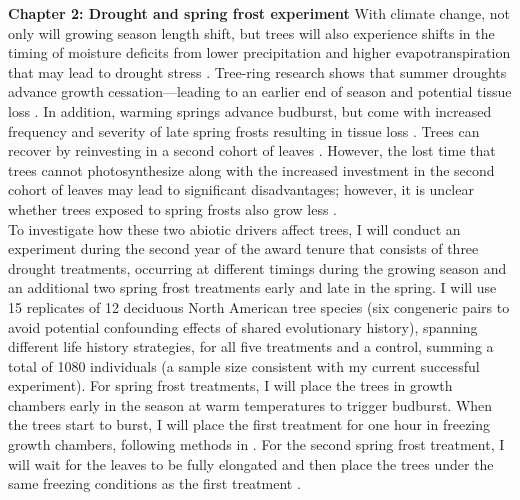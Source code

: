 \documentclass[12pt]{article}
\begin{document}
\textbf{Chapter 2: Drought and spring frost experiment}
With climate change, not only will growing season length shift, but trees will also experience shifts in the timing of moisture deficits from lower precipitation and higher evapotranspiration that may lead to drought stress \citep{dox_wood_2022}. Tree-ring research shows that summer droughts advance growth cessation---leading to an earlier end of season \citep{kang_earlier_2023} and potential tissue loss \citep{kramer_why_2012}. In addition, warming springs advance budburst, but come with increased frequency and severity of late spring frosts resulting in tissue loss \citep{baumgarten_no_2023,kramer_why_2012}. Trees can recover by reinvesting in a second cohort of leaves \citep{baumgarten_no_2023,dandrea_winters_2019}. However, the lost time that trees cannot photosynthesize along with the increased investment in the second cohort of leaves may lead to significant disadvantages; however, it is unclear whether trees exposed to spring frosts also grow less \citep{chamberlain_late_2021,baumgarten_no_2023}. \\
To investigate how these two abiotic drivers affect trees, I will conduct an experiment during the second year of the award tenure that consists of three drought treatments, occurring at different timings during the growing season and an additional two spring frost treatments early and late in the spring. I will use 15 replicates of 12 deciduous North American tree species (six congeneric pairs to avoid potential confounding effects of shared evolutionary history), spanning different life history strategies, for all five treatments and a control, summing a total of 1080 individuals (a sample size consistent with my current successful experiment). For spring frost treatments, I will place the trees in growth chambers early in the season at warm temperatures to trigger budburst. When the trees start to burst, I will place the first treatment for one hour in freezing growth chambers, following methods in \citet{chamberlain_late_2021}. For the second spring frost treatment, I will wait for the leaves to be fully elongated and then place the trees under the same freezing conditions as the first treatment \citep{zohner_increased_2018}.\\
\end{document}
